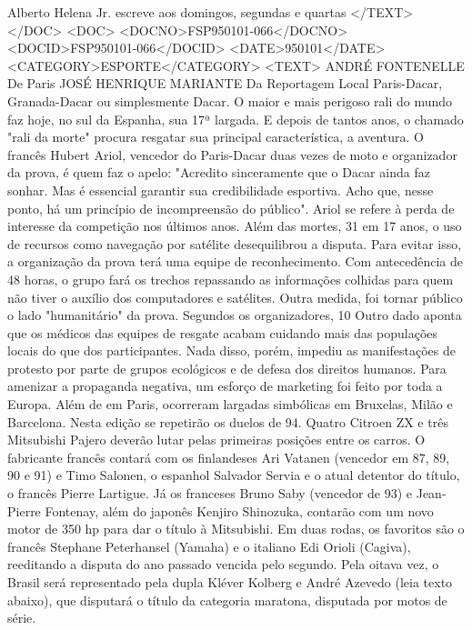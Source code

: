 Alberto Helena Jr. escreve aos domingos, segundas e quartas
</TEXT>
</DOC>
<DOC>
<DOCNO>FSP950101-066</DOCNO>
<DOCID>FSP950101-066</DOCID>
<DATE>950101</DATE>
<CATEGORY>ESPORTE</CATEGORY>
<TEXT>
ANDRÉ FONTENELLE
De Paris  
JOSÉ HENRIQUE MARIANTE 
Da Reportagem Local 
Paris-Dacar, Granada-Dacar ou simplesmente Dacar. O maior e mais perigoso rali do mundo faz hoje, no sul da Espanha, sua 17ª largada.
E depois de tantos anos, o chamado "rali da morte" procura resgatar sua principal característica, a aventura.
O francês Hubert Ariol, vencedor do Paris-Dacar duas vezes de moto e organizador da prova, é quem faz o apelo: "Acredito sinceramente que o Dacar ainda faz sonhar. Mas é essencial garantir sua credibilidade esportiva. Acho que, nesse ponto, há um princípio de incompreensão do público".
Ariol se refere à perda de interesse da competição nos últimos anos. Além das mortes, 31 em 17 anos, o uso de recursos como navegação por satélite desequilibrou a disputa.
Para evitar isso, a organização da prova terá uma equipe de reconhecimento. Com antecedência de 48 horas, o grupo fará os trechos repassando as informações colhidas para quem não tiver o auxílio dos computadores e satélites.
Outra medida, foi tornar público o lado "humanitário" da prova.
Segundos os organizadores, 10%
Outro dado aponta que os médicos das equipes de resgate acabam cuidando mais das populações locais do que dos participantes.
Nada disso, porém, impediu as manifestações de protesto por parte de grupos ecológicos e de defesa dos direitos humanos.
Para amenizar a propaganda negativa, um esforço de marketing foi feito por toda a Europa. Além de em Paris, ocorreram largadas simbólicas em Bruxelas, Milão e Barcelona.
Nesta edição se repetirão os duelos de 94. Quatro Citroen ZX e três Mitsubishi Pajero deverão lutar pelas primeiras posições entre os carros.
O fabricante francês contará com os finlandeses Ari Vatanen (vencedor em 87, 89, 90 e 91) e Timo Salonen, o espanhol Salvador Servia e o atual detentor do título, o francês Pierre Lartigue.
Já os franceses Bruno Saby (vencedor de 93) e Jean-Pierre Fontenay, além do japonês Kenjiro Shinozuka, contarão com um novo motor de 350 hp para dar o título à Mitsubishi.
Em duas rodas, os favoritos são o francês Stephane Peterhansel (Yamaha) e o italiano Edi Orioli (Cagiva), reeditando a disputa do ano passado vencida pelo segundo.
Pela oitava vez, o Brasil será representado pela dupla Kléver Kolberg e André Azevedo (leia texto abaixo), que disputará o título da categoria maratona, disputada por motos de série.
